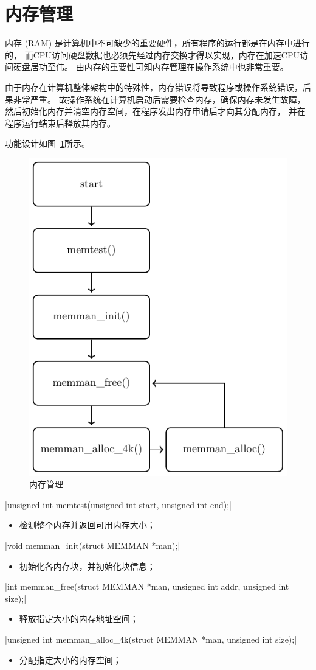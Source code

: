 \section{内存管理}

内存 (RAM) 是计算机中不可缺少的重要硬件，所有程序的运行都是在内存中进行的，
而CPU访问硬盘数据也必须先经过内存交换才得以实现，内存在加速CPU访问硬盘居功至伟。
由内存的重要性可知内存管理在操作系统中也非常重要。	

由于内存在计算机整体架构中的特殊性，内存错误将导致程序或操作系统错误，后果非常严重。
故操作系统在计算机启动后需要检查内存，确保内存未发生故障，
然后初始化内存并清空内存空间，在程序发出内存申请后才向其分配内存，
并在程序运行结束后释放其内存。

功能设计如图~\ref{fig:memman}所示。
\begin{figure}[H]
  \centering
  \includegraphics[width=.5\textwidth]{../Fig/func/memman.pdf}
  \caption{内存管理}
  \label{fig:memman}
\end{figure}

\begin{description}
  \csingle|unsigned int memtest(unsigned int start, unsigned int end);|
  \begin{itemize}
    \item 检测整个内存并返回可用内存大小；
  \end{itemize}
  \csingle|void memman_init(struct MEMMAN *man);|
  \begin{itemize}
    \item 初始化各内存块，并初始化块信息；
  \end{itemize}
  \csingle|int memman_free(struct MEMMAN *man, unsigned int addr, unsigned int size);|
  \begin{itemize}
    \item 释放指定大小的内存地址空间；
  \end{itemize}
  \csingle|unsigned int memman_alloc_4k(struct MEMMAN *man, unsigned int size);|
  \begin{itemize}
    \item 分配指定大小的内存空间；\\
  \end{itemize}
\end{description}

